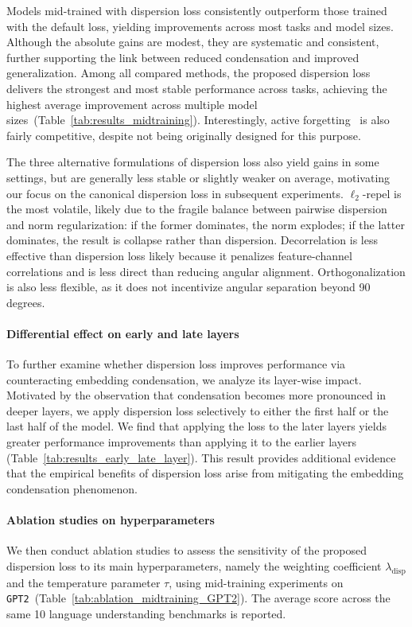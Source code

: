 \documentclass{article}
\theoremstyle{plain}
\theoremstyle{definition}
\theoremstyle{remark}
\begin{document}
Models mid-trained with dispersion loss consistently outperform those trained with the default loss, yielding improvements across most tasks and model sizes. Although the absolute gains are modest, they are systematic and consistent, further supporting the link between reduced condensation and improved generalization. Among all compared methods, the proposed dispersion loss delivers the strongest and most stable performance across tasks, achieving the highest average improvement across multiple model sizes~(Table~\ref{tab:results_midtraining}). Interestingly, active forgetting~\cite{active_forgetting} is also fairly competitive, despite not being originally designed for this purpose.

The three alternative formulations of dispersion loss also yield gains in some settings, but are generally less stable or slightly weaker on average, motivating our focus on the canonical dispersion loss in subsequent experiments. $\ell_2$-repel is the most volatile, likely due to the fragile balance between pairwise dispersion and norm regularization: if the former dominates, the norm explodes; if the latter dominates, the result is collapse rather than dispersion. Decorrelation is less effective than dispersion loss likely because it penalizes feature-channel correlations and is less direct than reducing angular alignment. Orthogonalization is also less flexible, as it does not incentivize angular separation beyond 90 degrees.

\vspace{-4pt}
\paragraph{Differential effect on early and late layers}
To further examine whether dispersion loss improves performance via counteracting embedding condensation, we analyze its layer-wise impact. Motivated by the observation that condensation becomes more pronounced in deeper layers, we apply dispersion loss selectively to either the first half or the last half of the model. We find that applying the loss to the later layers yields greater performance improvements than applying it to the earlier layers (Table~\ref{tab:results_early_late_layer}). This result provides additional evidence that the empirical benefits of dispersion loss arise from mitigating the embedding condensation phenomenon.

\vspace{-4pt}
\paragraph{Ablation studies on hyperparameters}
We then conduct ablation studies to assess the sensitivity of the proposed dispersion loss to its main hyperparameters, namely the weighting coefficient $\lambda_{\text{disp}}$ and the temperature parameter $\tau$, using mid-training experiments on \texttt{GPT2}~(Table~\ref{tab:ablation_midtraining_GPT2}). The average score across the same 10 language understanding benchmarks is reported.
\end{document}
